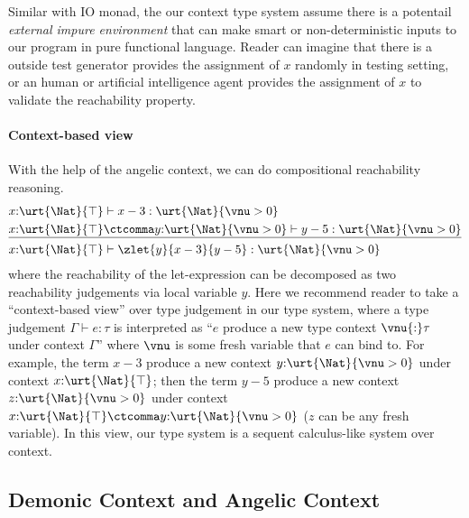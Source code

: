 Similar with IO monad, the our context type system assume there is a potentail \emph{external impure environment} that can make smart or non-deterministic inputs to our program in pure functional language.
Reader can imagine that there is a outside test generator provides the assignment of $x$ randomly in testing setting, or an human or artificial intelligence agent provides the assignment of $x$ to validate the reachability property.

\paragraph{Context-based view} With the help of the angelic context, we can do compositional reachability reasoning.
\begin{align*}
  &x{:}\urt{\Nat}{\top} \vdash x - 3 : \urt{\Nat}{\vnu > 0}
  \\&\underline{x{:}\urt{\Nat}{\top} \ctcomma y{:}\urt{\Nat}{\vnu > 0} \vdash y - 5 : \urt{\Nat}{\vnu > 0}}
  \\&x{:}\urt{\Nat}{\top} \vdash \zlet{y}{x - 3}{y - 5} : \urt{\Nat}{\vnu > 0}
\end{align*}\noindent
where the reachability of the let-expression can be decomposed as two reachability judgements via local variable $y$. Here we recommend reader to take a ``context-based view'' over type judgement in our type system, where a type judgement $\Gamma \vdash e : \tau$ is interpreted as ``$e$ produce a new type context $\vnu{:}\tau$ under context $\Gamma$'' where $\vnu$ is some fresh variable that $e$ can bind to. For example, the term $x - 3$ produce a new context $y{:}\urt{\Nat}{\vnu > 0}$ under context $x{:}\urt{\Nat}{\top}$; then the term $y - 5$ produce a new context $z{:}\urt{\Nat}{\vnu > 0}$ under context $x{:}\urt{\Nat}{\top} \ctcomma y{:}\urt{\Nat}{\vnu > 0}$ ($z$ can be any fresh variable). In this view, our type system is a sequent calculus-like system over context.

\subsection{Demonic Context and Angelic Context}

